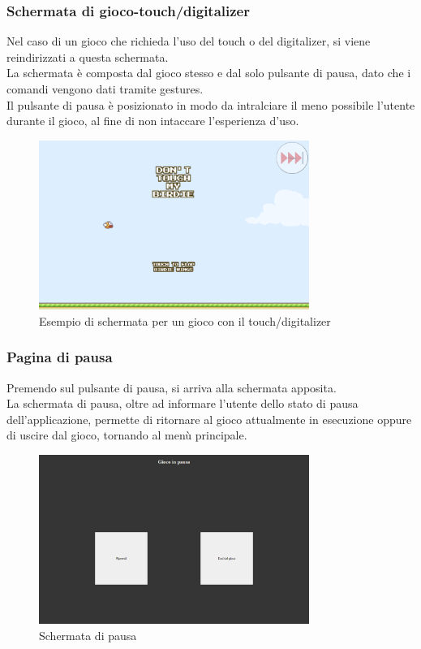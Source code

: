 \subsubsection{Schermata di gioco-touch/digitalizer}
Nel caso di un gioco che richieda l'uso del touch o del digitalizer, si viene reindirizzati a questa schermata.\\
La schermata è composta dal gioco stesso e dal solo pulsante di pausa, dato che i comandi vengono dati tramite gestures.\\
Il pulsante di pausa è posizionato in modo da intralciare il meno possibile l'utente durante il gioco, al fine di non intaccare l'esperienza d'uso.
\begin{figure}[h]
    \centering
    \includegraphics[width=250pt]{images/product/schermataGiocoTouchDigit.png}
    \caption{Esempio di schermata per un gioco con il touch/digitalizer}
    \label{fig:schermataGiocoTouchDigit}
\end{figure}
\newpage
\subsubsection{Pagina di pausa}
Premendo sul pulsante di pausa, si arriva alla schermata apposita.\\
La schermata di pausa, oltre ad informare l'utente dello stato di pausa dell'applicazione, permette di ritornare al gioco attualmente in esecuzione oppure di uscire dal gioco, tornando al menù principale.
\begin{figure}[h]
    \centering
    \includegraphics[width=250pt]{images/product/schermataPausaGioco.png}
    \caption{Schermata di pausa}
    \label{fig:schermataPausaGioco}
\end{figure}
